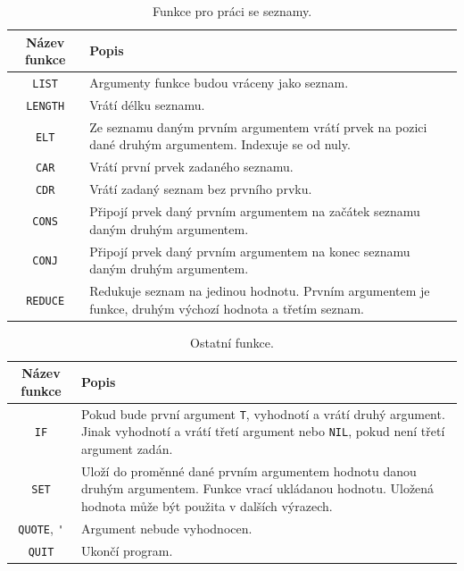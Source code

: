\documentclass[12pt, a4paper]{report}
\begin{document}
{\begin{table}[ht]
	\caption{Funkce pro práci se seznamy.}
	\centering
	\vspace{5pt}
	
	\begin{tabular}{||c p{11cm}||} 
		\hline
		Název funkce & Popis \\ %
		\hline\hline
		\verb|LIST| & Argumenty funkce budou vráceny jako seznam. \\ 
		\hline
		\verb|LENGTH| & Vrátí délku seznamu. \\ 
		\hline
		\verb|ELT| & Ze seznamu daným prvním argumentem vrátí prvek na pozici dané druhým argumentem. Indexuje se od nuly. \\ 
		\hline
		\verb|CAR| & Vrátí první prvek zadaného seznamu.  \\ 
		\hline
		\verb|CDR| & Vrátí zadaný seznam bez prvního prvku. \\ 
		\hline
		\verb|CONS| & Připojí prvek daný prvním argumentem na začátek seznamu daným druhým argumentem. \\ 
		\hline
		\verb|CONJ| & Připojí prvek daný prvním argumentem na konec seznamu daným druhým argumentem. \\ 
		\hline
		\verb|REDUCE| & Redukuje seznam na jedinou hodnotu. Prvním argumentem je funkce, druhým výchozí hodnota a třetím seznam. \\ 
		\hline
	\end{tabular}
\end{table}

\begin{table}[ht]
	\caption{Ostatní funkce.}
	\centering
	\vspace{5pt}
	
	\begin{tabular}{||c p{11cm}||} 
		\hline
		Název funkce & Popis \\ %
		\hline\hline
		\verb|IF| & Pokud bude první argument \verb|T|, vyhodnotí a vrátí druhý argument. Jinak vyhodnotí a vrátí třetí argument nebo \verb|NIL|, pokud není třetí argument zadán. \\ 
		\hline
		\verb|SET| & Uloží do proměnné dané prvním argumentem hodnotu danou druhým argumentem. Funkce vrací ukládanou hodnotu. Uložená hodnota může být použita v dalších výrazech. \\ 
		\hline
		\verb|QUOTE|, \verb|'| & Argument nebude vyhodnocen. \\ 
		\hline
		\verb|QUIT| & Ukončí program. \\ 
		\hline
	\end{tabular}
\end{table}

}
\end{document}
